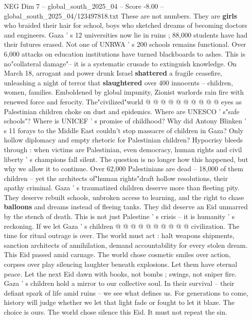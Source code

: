 \begin{textsample}{NEG Dim 7 – global\_south\_2025\_04 – Score -8.00 – global\_south\_2025\_04/123497818.txt}
These are not numbers.
They are \textbf{girls} who braided their hair for school, boys who sketched dreams of becoming doctors and engineers.
Gaza ' s 12 universities now lie in ruins ; 88,000 students have had their futures erased.
Not one of UNRWA ' s 200 schools remains functional.
Over 6,000 attacks on education institutions have turned blackboards to ashes.
This is no"collateral damage"-- it is a systematic crusade to extinguish knowledge.
On March 18, arrogant and power drunk Israel \textbf{shattered} a fragile ceasefire, unleashing a night of terror that \textbf{slaughtered} over 400 innocents -- children, women, families.
Emboldened by global impunity, Zionist warlords rain fire with renewed force and ferocity.
The"civilized"world @ @ @ @ @ @ @ @ @ @ eyes as Palestinian children choke on dust and epidemics.
Where are UNESCO ' s"safe schools"?
Where is UNICEF ' s promise of childhood?
Why did Antony Blinken ' s 11 forays to the Middle East couldn't stop massacre of children in Gaza?
Only hollow diplomacy and empty rhetoric for Palestinian children?
Hypocrisy bleeds through : when victims are Palestinian, even democracy, human rights and civil liberty ' s champions fall silent.
The question is no longer how this happened, but why we allow it to continue.
Over 62,000 Palestinians are dead -- 18,000 of them children -- yet the architects of"human rights"draft hollow resolutions, their apathy criminal.
Gaza ' s traumatized children deserve more than fleeting pity.
They deserve rebuilt schools, unbroken access to learning, and the right to chase \textbf{balloons} and dreams instead of fleeing tanks.
They did deserve an Eid unmarred by the stench of death.
This is not just Palestine ' s crisis -- it is humanity ' s reckoning.
If we let Gaza ' s children @ @ @ @ @ @ @ @ @ @ civilization.
The time for ritual outrage is over.
The world must act : halt weapons shipments, sanction architects of annihilation, demand accountability for every stolen dream.
This Eid passed amid carnage.
The world chose cosmetic smiles over action, corpses over play silencing laughter beneath explosions.
Let them have eternal peace.
Let the next Eid dawn with books, not bombs ; swings, not sniper fire.
Gaza ' s children hold a mirror to our collective soul.
In their survival -- their defiant spark of life amid ruins -- we see what defines us.
For generations to come, history will judge whether we let that light fade or fought to let it blaze.
The choice is ours.
The world chose silence this Eid.
It must not repeat the sin.

\end{textsample}
